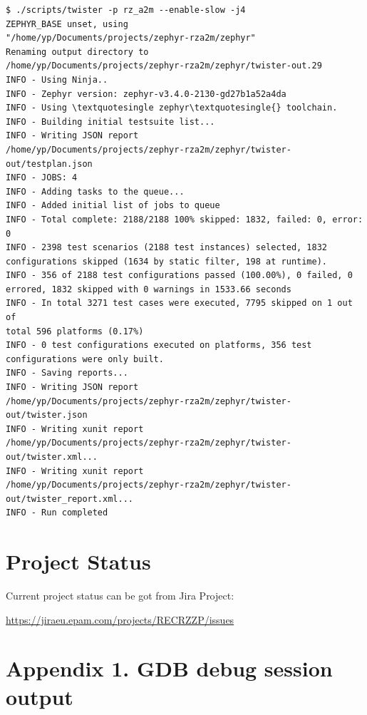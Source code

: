 \documentclass[11pt,a4paper,oneside]{article}
\begin{document}
\begin{lstlisting}
$ ./scripts/twister -p rz_a2m --enable-slow -j4
ZEPHYR_BASE unset, using
"/home/yp/Documents/projects/zephyr-rza2m/zephyr"
Renaming output directory to
/home/yp/Documents/projects/zephyr-rza2m/zephyr/twister-out.29
INFO - Using Ninja..
INFO - Zephyr version: zephyr-v3.4.0-2130-gd27b1a52a4da
INFO - Using \textquotesingle zephyr\textquotesingle{} toolchain.
INFO - Building initial testsuite list...
INFO - Writing JSON report
/home/yp/Documents/projects/zephyr-rza2m/zephyr/twister-out/testplan.json
INFO - JOBS: 4
INFO - Adding tasks to the queue...
INFO - Added initial list of jobs to queue
INFO - Total complete: 2188/2188 100% skipped: 1832, failed: 0, error:
0
INFO - 2398 test scenarios (2188 test instances) selected, 1832
configurations skipped (1634 by static filter, 198 at runtime).
INFO - 356 of 2188 test configurations passed (100.00%), 0 failed, 0
errored, 1832 skipped with 0 warnings in 1533.66 seconds
INFO - In total 3271 test cases were executed, 7795 skipped on 1 out of
total 596 platforms (0.17%)
INFO - 0 test configurations executed on platforms, 356 test
configurations were only built.
INFO - Saving reports...
INFO - Writing JSON report
/home/yp/Documents/projects/zephyr-rza2m/zephyr/twister-out/twister.json
INFO - Writing xunit report
/home/yp/Documents/projects/zephyr-rza2m/zephyr/twister-out/twister.xml...
INFO - Writing xunit report
/home/yp/Documents/projects/zephyr-rza2m/zephyr/twister-out/twister_report.xml...
INFO - Run completed
\end{lstlisting}

\section{Project Status}\label{project-status}

Current project status can be got from Jira Project:

\url{https://jiraeu.epam.com/projects/RECRZZP/issues}

\section*{Appendix 1. GDB debug session
output}\label{appendix-1.-gdb-debug-session-output}
\end{document}
